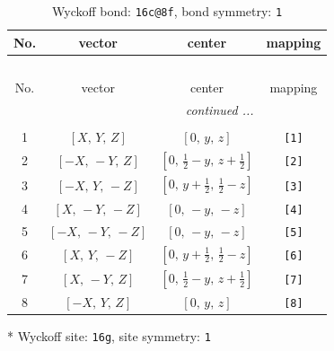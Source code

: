 \documentclass[fleqn,8pt]{jsarticle}
\begin{document}
\renewcommand{\arraystretch}{1.2}
\begin{longtable}{cccc}
\caption{Wyckoff bond: {\tt 16c@8f}, bond symmetry: {\tt 1}}
 \\
 \hline \hline
No. & vector & center & mapping \\ \hline \endfirsthead

\multicolumn{3}{l}{\tablename\ \thetable{}} \\
 \hline \hline
No. & vector & center & mapping \\ \hline \endhead

 \hline \hline
\multicolumn{3}{r}{\footnotesize\it continued ...} \\ \endfoot

 \hline \hline
\multicolumn{3}{r}{} \\ \endlastfoot

1 & $\left[ X,\, Y,\, Z \right]$ & $\left[ 0,\, y,\, z \right]$ & {\tt [1]} \\ \hline
2 & $\left[ - X,\, - Y,\, Z \right]$ & $\left[ 0,\, \frac{1}{2} - y,\, z + \frac{1}{2} \right]$ & {\tt [2]} \\ \hline
3 & $\left[ - X,\, Y,\, - Z \right]$ & $\left[ 0,\, y + \frac{1}{2},\, \frac{1}{2} - z \right]$ & {\tt [3]} \\ \hline
4 & $\left[ X,\, - Y,\, - Z \right]$ & $\left[ 0,\, - y,\, - z \right]$ & {\tt [4]} \\ \hline
5 & $\left[ - X,\, - Y,\, - Z \right]$ & $\left[ 0,\, - y,\, - z \right]$ & {\tt [5]} \\ \hline
6 & $\left[ X,\, Y,\, - Z \right]$ & $\left[ 0,\, y + \frac{1}{2},\, \frac{1}{2} - z \right]$ & {\tt [6]} \\ \hline
7 & $\left[ X,\, - Y,\, Z \right]$ & $\left[ 0,\, \frac{1}{2} - y,\, z + \frac{1}{2} \right]$ & {\tt [7]} \\ \hline
8 & $\left[ - X,\, Y,\, Z \right]$ & $\left[ 0,\, y,\, z \right]$ & {\tt [8]} \\
\end{longtable}
* Wyckoff site: {\tt 16g}, site symmetry: {\tt 1}
\renewcommand{\arraystretch}{1.2}
\end{document}
